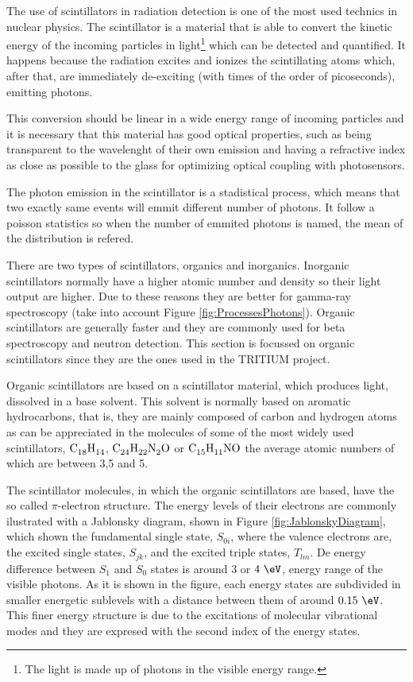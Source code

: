 The use of scintillators in radiation detection is one of the most used technics in nuclear physics. The scintillator is a material that is able to convert the kinetic energy of the incoming particles in light\footnote{The light is made up of photons in the visible energy range.} which can be detected and quantified. It happens because the radiation excites and ionizes the scintillating atoms which, after that, are immediately de-exciting (with times of the order of picoseconds), emitting photons.

This conversion should be linear in a wide energy range of incoming particles and it is necessary that this material has good optical properties, such as being transparent to the wavelenght of their own emission and having a refractive index as close as possible to the glass for optimizing optical coupling with photosensors.

The photon emission in the scintillator is a stadistical process, which means that two exactly same events will emmit different number of photons. It follow a poisson statistics so when the number of emmited photons is named, the mean of the distribution is refered.

There are two types of scintillators, organics and inorganics. Inorganic scintillators normally have a higher atomic number and density so their light output are higher. Due to these reasons they are better for gamma-ray spectroscopy (take into account Figure \ref{fig:ProcessesPhotons}). Organic scintillators are generally faster and they are commonly used for beta spectroscopy and neutron detection. This section is focussed on organic scintillators since they are the ones used in the TRITIUM project. 

Organic scintillators are based on a scintillator material, which produces light, dissolved in a base solvent. This solvent is normally based on aromatic hydrocarbons, that is, they are mainly composed of carbon and hydrogen atoms as can be appreciated in the molecules of some of the most widely used scintillators, $\ce{C_{18}H_{14}}$, $\ce{C_{24}H_{22}N_{2}O}$ or $\ce{C_{15}H_{11}NO}$ the average atomic numbers of which are between 3,5 and 5.

The scintillator molecules, in which the organic scintillators are based, have the so called $\pi$-electron structure. The energy levels of their electrons are commonly ilustrated with a Jablonsky diagram, shown in Figure \ref{fig:JablonskyDiagram}, which shown the fundamental single state, $S_{0i}$, where the valence electrons are, the excited single states, $S_{jk}$, and the excited triple states, $T_{lm}$. De energy difference between $S_1$ and $S_0$ states is around $3$ or $4~\eV$, energy range of the visible photons. As it is shown in the figure, each energy states are subdivided in smaller energetic sublevels with a distance between them of around $0.15~\eV$. This finer energy structure is due to the excitations of molecular vibrational modes and they are expresed with the second index of the energy states.

